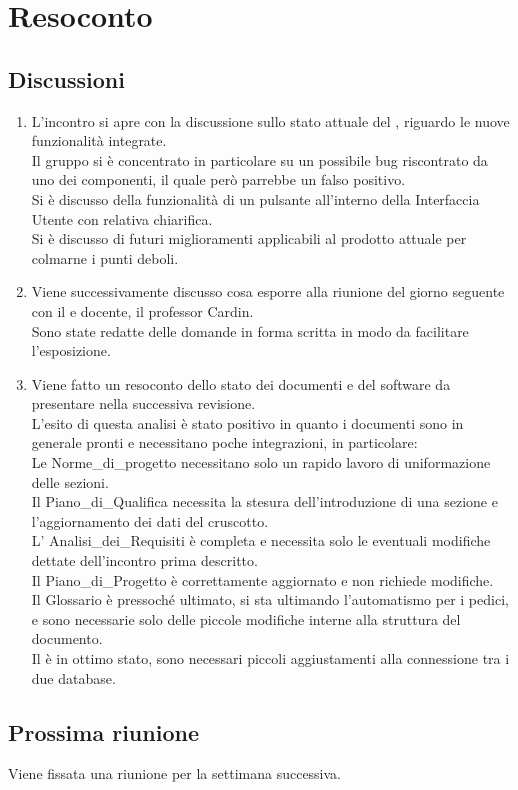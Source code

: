 \section{Resoconto} \label{sec:resoconto}
\subsection{Discussioni} \label{subsec:resdiscussione}
\begin{enumerate}
    \item L'incontro si apre con la discussione sullo stato attuale del , riguardo le nuove funzionalità integrate. \\Il gruppo si è concentrato in particolare su un possibile bug riscontrato da uno dei componenti, il quale però parrebbe un falso positivo. \\Si è discusso della funzionalità di un pulsante all'interno della Interfaccia Utente con relativa chiarifica. \\Si è discusso di futuri miglioramenti applicabili al prodotto attuale per colmarne i punti deboli.
    \item Viene successivamente discusso cosa esporre alla riunione del giorno seguente con il  e docente, il professor Cardin. \\Sono state redatte delle domande in forma scritta in modo da facilitare l'esposizione.
    \item Viene fatto un resoconto dello stato dei documenti e del software da presentare nella successiva revisione.\\L'esito di questa analisi è stato positivo in quanto i documenti sono in generale pronti e necessitano poche integrazioni, in particolare: \\Le Norme\_di\_progetto necessitano solo un rapido lavoro di uniformazione delle sezioni. \\Il Piano\_di\_Qualifica necessita la stesura dell'introduzione di una sezione e l'aggiornamento dei dati del cruscotto. \\L' Analisi\_dei\_Requisiti è completa e necessita solo le eventuali modifiche dettate dell'incontro prima descritto. \\Il Piano\_di\_Progetto è correttamente aggiornato e non richiede modifiche. \\Il Glossario è pressoché ultimato, si sta ultimando l'automatismo per i pedici, e sono necessarie solo delle piccole modifiche interne alla struttura del documento.\\Il {} è in ottimo stato, sono necessari piccoli aggiustamenti alla connessione tra i due database.
\end{enumerate}


\subsection{Prossima riunione} \label{subsec:riunione}
Viene fissata una riunione per la settimana successiva.
